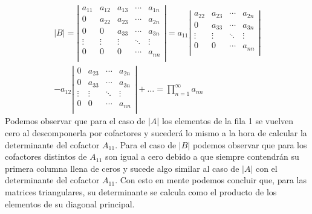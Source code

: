 \documentclass[12pt,titlepage]{article}
\begin{document}
\begin{enumerate}
\begin{gather}
\end{gather}
\begin{gather}
    \left|B\right|=\left|\begin{matrix}a_{11}&a_{12}&a_{13}&\cdots&a_{1n}\\0&a_{22}&a_{23}&\cdots&a_{2n}\\0&0&a_{33}&\cdots&a_{3n}\\\vdots&\vdots&\vdots&\ddots&\vdots\\0&0&0&\cdots&a_{nn}\\\end{matrix}\right|=a_{11}\left|\begin{matrix}a_{22}&a_{23}&\cdots&a_{2n}\\0&a_{33}&\cdots&a_{3n}\\\vdots&\vdots&\ddots&\vdots\\0&0&\cdots&a_{nn}\\\end{matrix}\right|\nonumber\\
    -a_{12}\left|\begin{matrix}0&a_{23}&\cdots&a_{2n}\\0&a_{33}&\cdots&a_{3n}\\\vdots&\vdots&\ddots&\vdots\\0&0&\cdots&a_{nn}\\\end{matrix}\right|+\ldots=\prod_{n=1}^{\infty}a_{nn}\nonumber
\end{gather}
Podemos observar que para el caso de $|A|$ los elementos de la fila 1 se vuelven cero al descomponerla por cofactores y sucederá lo mismo a la hora de calcular la determinante del cofactor $A_{11}$. Para el caso de $|B|$ podemos observar que para los cofactores distintos de $A_{11}$ son igual a cero debido a que siempre contendrán su primera columna llena de ceros y sucede algo similar al caso de $|A|$ con el determinante del cofactor $A_{11}$. Con esto en mente podemos concluir que, para las matrices triangulares, su determinante se calcula como el producto de los elementos de su diagonal principal.

\end{enumerate}
\end{document}
